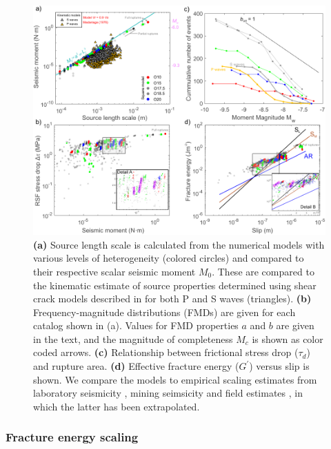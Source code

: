 \documentclass[final,3p, 11pt,authoryear]{elsarticle}
\begin{document}
\begin{figure}
	\centering
	\includegraphics[scale = 0.95]{FIG10.pdf} 
	\caption{\textbf{(a)} Source length scale is calculated from the numerical models with various levels of heterogeneity (colored circles) and compared to their respective scalar seismic moment $M_{0}$. These are compared to the kinematic estimate of source properties determined using shear crack models described in \citet{Selvadurai2019} for both P and S waves (triangles). \textbf{(b)} Frequency-magnitude distributions (FMDs) are given for each catalog shown in (a).  Values for FMD properties $a$ and $b$ are given in the text, and the magnitude of completeness $M_{c}$ is shown as color coded arrows. \textbf{(c)} Relationship between frictional stress drop ($\tau_{d}$) and rupture area. \textbf{(d)} Effective fracture energy ($G^{'}$) versus slip is shown. We compare the models to empirical scaling estimates from laboratory seismicity \cite<black line>{Selvadurai2019}, mining seimsicity \cite<brown line>{Selvadurai2019} and field estimates \cite<blue line>{Abercrombie2005}, in which the latter has been extrapolated.}
	\label{fig10}
\end{figure}

\subsubsection{Fracture energy scaling}
\end{document}
